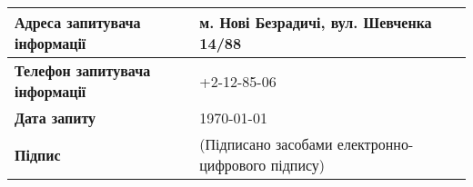 \documentclass[a4paper,12pt]{article}
\begin{document}
  \begin{tabular}{| p{} | p{} |}
    \hline
    \textbf{Адреса запитувача інформації} & м. Нові Безрадичі, вул. Шевченка 14/88 \\
    \hline
    \textbf{Телефон запитувача інформації} & +2-12-85-06 \\
    \hline
    \textbf{Дата запиту} & \today \\
    \hline
    \textbf{Підпис} & (Підписано засобами електронно-цифрового підпису) \\
    \hline
  \end{tabular}\\\\
\end{document}
